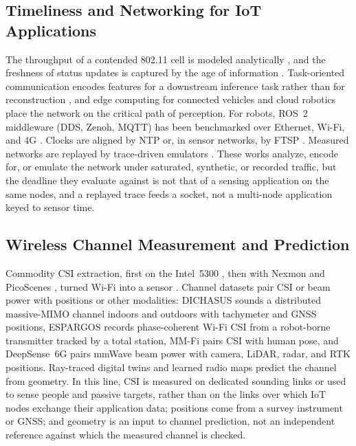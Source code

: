\subsection{Timeliness and Networking for IoT Applications}
The throughput of a contended 802.11 cell is modeled analytically
\cite{bianchi2000dcf}, and the freshness of status updates is captured
by the age of information \cite{kaul2012aoi,yates2021aoi}.
Task-oriented communication encodes features for a downstream
inference task rather than for reconstruction
\cite{shao2022taskoriented}, and edge computing for connected vehicles
\cite{liu2019edgeav} and cloud robotics \cite{kehoe2015cloud} place
the network on the critical path of perception. For robots, ROS~2
middleware (DDS, Zenoh, MQTT) has been benchmarked over Ethernet,
Wi-Fi, and 4G \cite{zhang2024ros2middleware}. Clocks are aligned by
NTP \cite{mills1991ntp} or, in sensor networks, by FTSP
\cite{maroti2004ftsp}. Measured networks are replayed by trace-driven
emulators \cite{noble1997trace,winstein2013sprout,netravali2015mahimahi,yan2018pantheon,hemminger2005netem}.
These works analyze, encode for, or emulate the network under
saturated, synthetic, or recorded traffic, but the deadline they
evaluate against is not that of a sensing application on the same
nodes, and a replayed trace feeds a socket, not a multi-node
application keyed to sensor time.

\subsection{Wireless Channel Measurement and Prediction}
Commodity CSI extraction, first on the Intel~5300
\cite{halperin2011csitool}, then with Nexmon \cite{nexmon} and
PicoScenes \cite{jiang2022picoscenes}, turned Wi-Fi into a sensor
\cite{ma2019wifisensing}. Channel datasets pair CSI or beam power with
positions or other modalities: DICHASUS \cite{dichasus} sounds a
distributed massive-MIMO channel indoors and outdoors with tachymeter
and GNSS positions, ESPARGOS \cite{espargos} records phase-coherent
Wi-Fi CSI from a robot-borne transmitter tracked by a total station,
MM-Fi \cite{mmfi} pairs CSI with human pose, and DeepSense~6G
\cite{deepsense6g} pairs mmWave beam power with camera, LiDAR, radar,
and RTK positions. Ray-traced digital twins
\cite{hoydis2023sionnart,alkhateeb2023digitaltwin,bostontwin,deepmimo}
and learned radio maps \cite{levie2021radiounet} predict the channel
from geometry. In this line, CSI is measured on dedicated sounding
links or used to sense people and passive targets, rather than on the
links over which IoT nodes exchange their application data; positions
come from a survey instrument or GNSS; and geometry is an input to
channel prediction, not an independent reference against which the
measured channel is checked.

